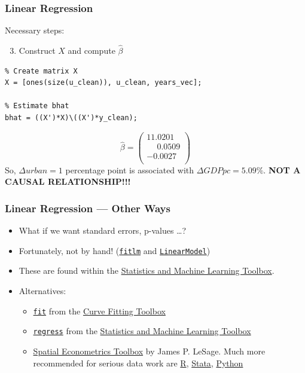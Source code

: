 \documentclass[11pt,xcolor={svgnames},aspectratio=169,usepdftitle=false]{beamer}
\begin{document}
\begin{frame}[fragile]
  \frametitle{Linear Regression}
Necessary steps:
\begin{enumerate}
  \setcounter{enumi}{2}
  \item Construct $X$ and compute $\hat{\beta}$
\end{enumerate}
\begin{lstlisting}
% Create matrix X
X = [ones(size(u_clean)), u_clean, years_vec];

% Estimate bhat
bhat = ((X')*X)\((X')*y_clean);
\end{lstlisting}
\[
\hat{\beta} = \begin{pmatrix}
11.0201 \\
\phantom{-}0.0509  \\
-0.0027 \\
\end{pmatrix}
\]
So, $\Delta urban = 1$ percentage point is associated with $\Delta GDPpc =  5.09\%$. \alert{\textbf{NOT A CAUSAL RELATIONSHIP!!!}}
\end{frame}

\begin{frame}[fragile]
  \frametitle{Linear Regression --- Other Ways}
\begin{itemize}
  \item What if we want standard errors, p-values \ldots ?
  \item Fortunately, not by hand! (\href{https://www.mathworks.com/help/stats/fitlm.html?s_tid=doc_ta}{\texttt{fitlm}} and \href{https://www.mathworks.com/help/stats/linearmodel.html}{\texttt{LinearModel}})
  \item These are found within the \href{https://www.mathworks.com/help/stats/index.html?s_tid=CRUX_lftnav}{Statistics and Machine Learning Toolbox}.
  \item Alternatives:
  \begin{itemize}
    \item \href{https://www.mathworks.com/help/curvefit/fit.html?s_tid=doc_ta}{\texttt{fit}} from the \href{https://www.mathworks.com/help/curvefit/index.html?s_tid=CRUX_lftnav}{Curve Fitting Toolbox}
    \item \href{https://www.mathworks.com/help/stats/regress.html}{\texttt{regress}} from the \href{https://www.mathworks.com/help/stats/index.html?s_tid=CRUX_lftnav}{Statistics and Machine Learning Toolbox}
    \item \href{https://www.spatial-econometrics.com/}{Spatial Econometrics Toolbox} by James P. LeSage. Much more recommended for serious data work are \href{https://www.r-project.org/}{R}, \href{https://www.stata.com/}{Stata}, \href{https://www.python.org/}{Python}
  \end{itemize}
\end{itemize}
\end{frame}
\end{document}
